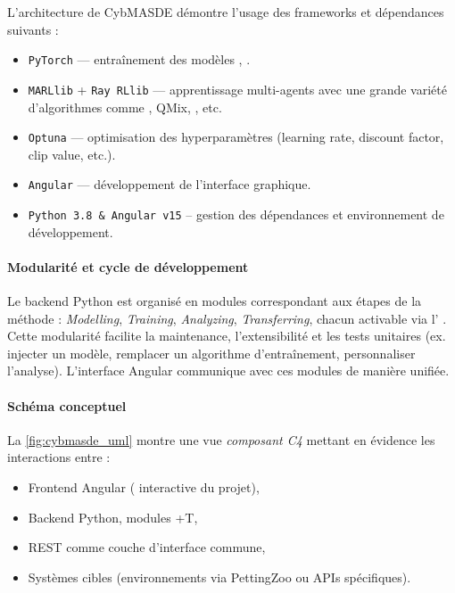 L’architecture de CybMASDE démontre l’usage des frameworks et dépendances suivants :
\begin{itemize}
  \item \texttt{PyTorch} — entraînement des modèles , .
  \item \texttt{MARLlib} + \texttt{Ray RLlib} — apprentissage multi-agents avec une grande variété d'algorithmes comme , QMix, , etc.
  \item \texttt{Optuna} — optimisation des hyperparamètres (learning rate, discount factor,  clip value, etc.).
  \item \texttt{Angular} — développement de l’interface graphique.
  \item \texttt{Python 3.8 \& Angular v15} -- gestion des dépendances et environnement de développement.
\end{itemize}



\paragraph{Modularité et cycle de développement}
Le backend Python est organisé en modules correspondant aux étapes de la méthode  :
\textit{Modelling}, \textit{Training}, \textit{Analyzing}, \textit{Transferring}, chacun activable via l’ .
Cette modularité facilite la maintenance, l’extensibilité et les tests unitaires (ex. injecter un modèle, remplacer un algorithme d’entraînement, personnaliser l’analyse). L’interface Angular communique avec ces modules de manière unifiée.

\paragraph{Schéma conceptuel}
La \autoref{fig:cybmasde_uml} montre une vue \textit{composant C4} mettant en évidence les interactions entre :
\begin{itemize}
  \item \textsf{Frontend Angular} ( interactive du projet),
  \item \textsf{Backend Python}, modules +T,
  \item \textsf{ REST} comme couche d’interface commune,
  \item \textsf{Systèmes cibles} (environnements via PettingZoo ou APIs spécifiques).
\end{itemize}

